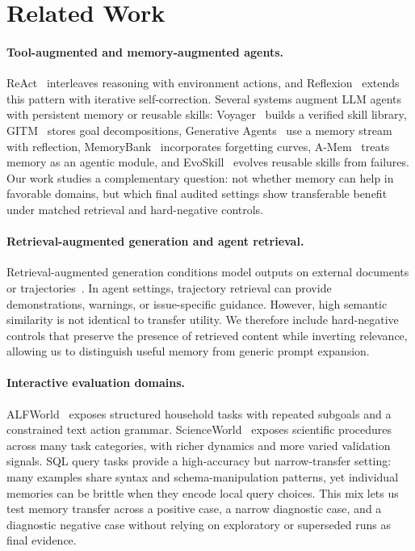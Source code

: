 \section{Related Work}

\paragraph{Tool-augmented and memory-augmented agents.}
ReAct~\citep{yao2023react} interleaves reasoning with environment actions, and Reflexion~\citep{shinn2023reflexion} extends this pattern with iterative self-correction.
Several systems augment LLM agents with persistent memory or reusable skills: Voyager~\citep{wang2023voyager} builds a verified skill library, GITM~\citep{zhu2023gitm} stores goal decompositions, Generative Agents~\citep{park2023generative} use a memory stream with reflection, MemoryBank~\citep{zhong2024memorybank} incorporates forgetting curves, A-Mem~\citep{xu2025amem} treats memory as an agentic module, and EvoSkill~\citep{alzubi2026evoskill} evolves reusable skills from failures.
Our work studies a complementary question: not whether memory can help in favorable domains, but which final audited settings show transferable benefit under matched retrieval and hard-negative controls.

\paragraph{Retrieval-augmented generation and agent retrieval.}
Retrieval-augmented generation conditions model outputs on external documents or trajectories~\citep{lewis2020rag}.
In agent settings, trajectory retrieval can provide demonstrations, warnings, or issue-specific guidance.
However, high semantic similarity is not identical to transfer utility.
We therefore include hard-negative controls that preserve the presence of retrieved content while inverting relevance, allowing us to distinguish useful memory from generic prompt expansion.

\paragraph{Interactive evaluation domains.}
ALFWorld~\citep{shridhar2021alfworld} exposes structured household tasks with repeated subgoals and a constrained text action grammar.
ScienceWorld~\citep{wang2022scienceworld} exposes scientific procedures across many task categories, with richer dynamics and more varied validation signals.
SQL query tasks provide a high-accuracy but narrow-transfer setting: many examples share syntax and schema-manipulation patterns, yet individual memories can be brittle when they encode local query choices.
This mix lets us test memory transfer across a positive case, a narrow diagnostic case, and a diagnostic negative case without relying on exploratory or superseded runs as final evidence.
